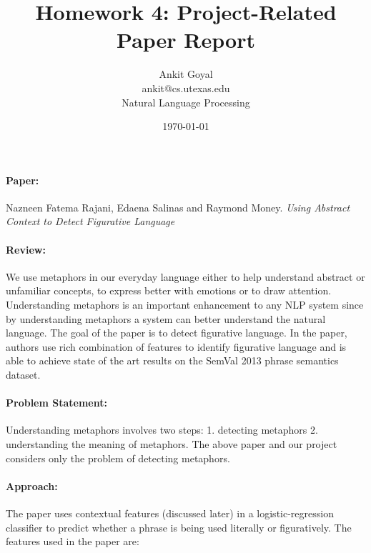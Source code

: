 \documentclass[11pt] {article}
\author{Ankit Goyal \\ankit@cs.utexas.edu \\ Natural Language Processing}
\title{Homework 4: Project-Related Paper Report}
\date{\today}
\begin{document}
\maketitle


\paragraph{Paper:} Nazneen Fatema Rajani, Edaena Salinas and Raymond Money. \emph	{Using Abstract Context to Detect Figurative Language}


\paragraph{Review:} We use metaphors in our everyday language either to help understand abstract or unfamiliar concepts, to express better with emotions or to draw attention. Understanding metaphors is an important enhancement to any NLP system since by understanding metaphors a system can better understand the natural language. The goal of the paper is to detect figurative language. In the paper, authors use rich combination of features to identify figurative language and is able to achieve state of the art results on the SemVal 2013 phrase semantics dataset. 

\paragraph{Problem Statement:} Understanding metaphors involves two steps: 1. detecting metaphors 2. understanding the meaning of metaphors. The above paper and our project considers only the problem of detecting metaphors. 

\paragraph{Approach:} The paper uses contextual features (discussed later) in a logistic-regression classifier to predict whether a phrase is being used literally or figuratively. The features used in the paper are: 
\end{document}
